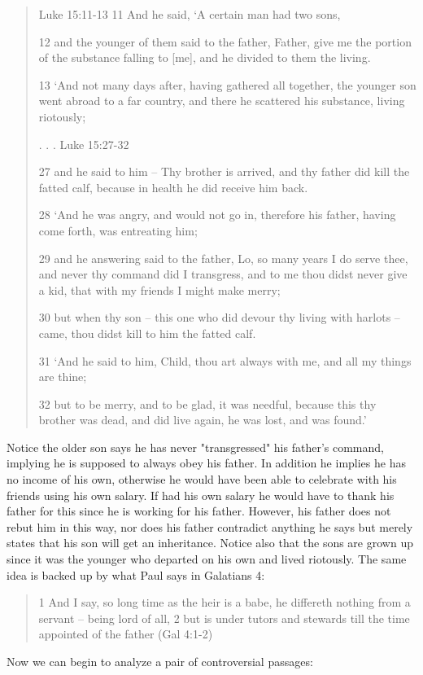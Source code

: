 \documentclass[11pt]{article}
\begin{document}
\begin{quote}
Luke 15:11-13
11 And he said, `A certain man had two sons,

12 and the younger of them said to the father, Father, give me the portion of the substance falling to [me], and he divided to them the living.

13 `And not many days after, having gathered all together, the younger son went abroad to a far country, and there he scattered his substance, living riotously;

. . . 
Luke 15:27-32

27 and he said to him -- Thy brother is arrived, and thy father did kill the fatted calf, because in health he did receive him back.

28 `And he was angry, and would not go in, therefore his father, having come forth, was entreating him;

29 and he answering said to the father, Lo, so many years I do serve thee, and never thy command did I transgress, and to me thou didst never give a kid, that with my friends I might make merry;

30 but when thy son -- this one who did devour thy living with harlots -- came, thou didst kill to him the fatted calf.

31 `And he said to him, Child, thou art always with me, and all my things are thine;

32 but to be merry, and to be glad, it was needful, because this thy brother was dead, and did live again, he was lost, and was found.' 
\end{quote}

Notice the older son says he has never "transgressed" his father's command, implying he is supposed to always obey his father. In addition he implies he has no income of his own, otherwise he would have been able to celebrate with his friends using his own salary. If had his own salary he would have to thank his father for this since he is working for his father. However, his father does not rebut him in this way, nor does his father contradict anything he says but merely states that his son will get an inheritance. Notice also that the sons are grown up since it was the younger who departed on his own and lived riotously. The same idea is backed up by what Paul says in Galatians 4:
\begin{quote}
1 And I say, so long time as the heir is a babe, he differeth nothing from a servant -- being lord of all,
2 but is under tutors and stewards till the time appointed of the father
(Gal 4:1-2)
\end{quote}
Now we can begin to analyze a pair of controversial passages:
\end{document}
